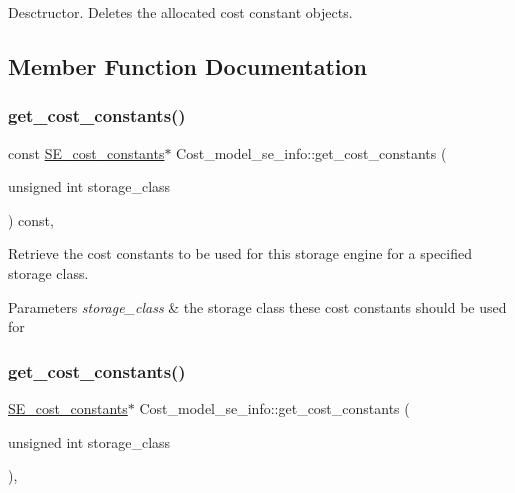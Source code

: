 Desctructor. Deletes the allocated cost constant objects. 

\subsection{Member Function Documentation}
\mbox{\label{classCost__model__se__info_ae9c47067de0d97223937e46188312f0d}} 
\subsubsection{\texorpdfstring{get\+\_\+cost\+\_\+constants()}{get\_cost\_constants()}\hspace{0.1cm}{\footnotesize\ttfamily [1/2]}}
{\footnotesize\ttfamily const \mbox{\hyperlink{classSE__cost__constants}{S\+E\+\_\+cost\+\_\+constants}}$\ast$ Cost\+\_\+model\+\_\+se\+\_\+info\+::get\+\_\+cost\+\_\+constants (\begin{DoxyParamCaption}\item[{unsigned int}]{storage\+\_\+class }\end{DoxyParamCaption}) const\hspace{0.3cm}{\ttfamily [inline]}, {\ttfamily [protected]}}

Retrieve the cost constants to be used for this storage engine for a specified storage class.


\begin{DoxyParams}{Parameters}
{\em storage\+\_\+class} & the storage class these cost constants should be used for \\
\hline
\end{DoxyParams}
\mbox{\label{classCost__model__se__info_a750bea533208ff61e58bd9982b91ae4b}} 
\subsubsection{\texorpdfstring{get\+\_\+cost\+\_\+constants()}{get\_cost\_constants()}\hspace{0.1cm}{\footnotesize\ttfamily [2/2]}}
{\footnotesize\ttfamily \mbox{\hyperlink{classSE__cost__constants}{S\+E\+\_\+cost\+\_\+constants}}$\ast$ Cost\+\_\+model\+\_\+se\+\_\+info\+::get\+\_\+cost\+\_\+constants (\begin{DoxyParamCaption}\item[{unsigned int}]{storage\+\_\+class }\end{DoxyParamCaption})\hspace{0.3cm}{\ttfamily [inline]}, {\ttfamily [protected]}}


